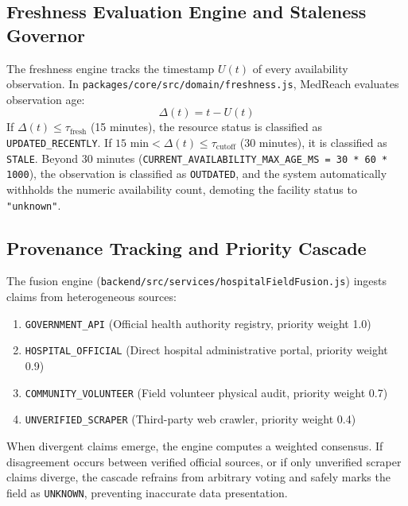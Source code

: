 \documentclass[conference]{IEEEtran}
\begin{document}
\subsection{Freshness Evaluation Engine and Staleness Governor}
The freshness engine tracks the timestamp $U(t)$ of every availability observation. In \texttt{packages/core/src/domain/freshness.js}, MedReach evaluates observation age:
\begin{equation}
\Delta(t) = t - U(t)
\end{equation}
If $\Delta(t) \le \tau_{\text{fresh}}$ (15 minutes), the resource status is classified as \texttt{UPDATED\_RECENTLY}. If $15\text{ min} < \Delta(t) \le \tau_{\text{cutoff}}$ (30 minutes), it is classified as \texttt{STALE}. Beyond 30 minutes (\texttt{CURRENT\_AVAILABILITY\_MAX\_AGE\_MS = 30 * 60 * 1000}), the observation is classified as \texttt{OUTDATED}, and the system automatically withholds the numeric availability count, demoting the facility status to \texttt{"unknown"}.

\subsection{Provenance Tracking and Priority Cascade}
The fusion engine (\texttt{backend/src/services/hospitalFieldFusion.js}) ingests claims from heterogeneous sources:
\begin{enumerate}
    \item \texttt{GOVERNMENT\_API} (Official health authority registry, priority weight 1.0)
    \item \texttt{HOSPITAL\_OFFICIAL} (Direct hospital administrative portal, priority weight 0.9)
    \item \texttt{COMMUNITY\_VOLUNTEER} (Field volunteer physical audit, priority weight 0.7)
    \item \texttt{UNVERIFIED\_SCRAPER} (Third-party web crawler, priority weight 0.4)
\end{enumerate}

When divergent claims emerge, the engine computes a weighted consensus. If disagreement occurs between verified official sources, or if only unverified scraper claims diverge, the cascade refrains from arbitrary voting and safely marks the field as \texttt{UNKNOWN}, preventing inaccurate data presentation.
\end{document}
